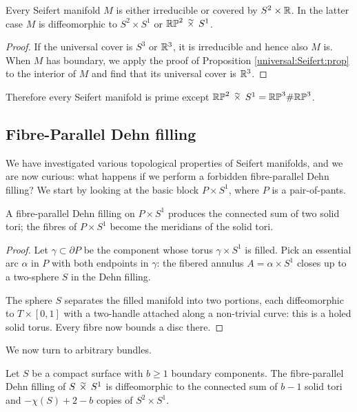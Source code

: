 \begin{cor}
Every Seifert manifold $M$ is either irreducible or covered by $S^2\times \mathbb{R}$. In the latter case $M$ is diffeomorphic to $S^2\times S^1$ or $\matRP^2\timtil S^1$.
\end{cor}
\begin{proof}
If the universal cover is $S^3$ or $\mathbb{R}^3$, it is irreducible and hence also $M$ is. When $M$ has boundary, we apply the proof of Proposition \ref{universal:Seifert:prop} to the interior of $M$ and find that its universal cover is $\mathbb{R}^3$.
\end{proof}

Therefore every Seifert manifold is prime except $\matRP^2 \timtil S^1 = \matRP^3 \# \matRP^3$.

\subsection{Fibre-Parallel Dehn filling}
We have investigated various topological properties of Seifert manifolds, and we are now curious: what happens if we perform a forbidden fibre-parallel Dehn filling? We start by looking at the basic block $P\times S^1$, where $P$ is a pair-of-pants.

\begin{prop}
A fibre-parallel Dehn filling on $P\times S^1$ produces the connected sum of two solid tori; the fibres of $P\times S^1$ become the meridians of the solid tori.
\end{prop}
\begin{proof}
Let $\gamma \subset \partial P$ be the component whose torus $\gamma \times S^1$ is filled. Pick an essential arc $\alpha$ in $P$ with both endpoints in $\gamma$: the fibered annulus $A = \alpha \times S^1$ closes up to a two-sphere $S$ in the Dehn filling. 

The sphere $S$ separates the filled manifold into two portions, each diffeomorphic to $T\times [0,1]$ with a two-handle attached along a non-trivial curve: this is a holed solid torus. Every fibre now bounds a disc there.
\end{proof}

We now turn to arbitrary bundles.

\begin{ex}
Let $S$ be a compact surface with $b\geqslant 1$ boundary components.
The fibre-parallel Dehn filling of $S \timtil S^1$ is diffeomorphic to the connected sum of $b-1$ solid tori and $-\chi(S)+2-b$ copies of $S^2\times S^1$.
\end{ex}

